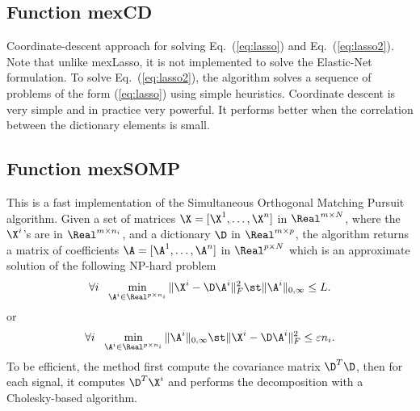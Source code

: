 \documentclass[a4paper, 11pt]{article}
\begin{document}
{\footnotesize

}


\subsection{Function mexCD}
Coordinate-descent approach for solving Eq.~(\ref{eq:lasso}) and
Eq.~(\ref{eq:lasso2}). Note that unlike mexLasso, it is not implemented to solve the Elastic-Net formulation.
To solve Eq.~(\ref{eq:lasso2}), the algorithm solves a
sequence of problems of the form (\ref{eq:lasso}) using simple heuristics.
Coordinate descent is very simple and in practice very powerful. It performs
better when the correlation between the dictionary elements is small. 

{\footnotesize

}

\subsection{Function mexSOMP}
This is a fast implementation of the Simultaneous Orthogonal Matching Pursuit algorithm. Given a set of matrices $\X=[\X^1,\ldots,\X^n]$  in $\Real^{m \times N}$, where the $\X^i$'s are in $\Real^{m \times n_i}$, and a dictionary $\D$ in $\Real^{m \times p}$, the algorithm returns a matrix of coefficients $\A=[\A^1,\ldots,\A^n]$ in $\Real^{p \times N}$ which is an approximate solution of the following NP-hard problem
\begin{equation}
   \forall i~~ \min_{\A^i \in \Real^{p \times n_i}} \|\X^i-\D\A^i\|_F^2 \st \|\A^i\|_{0,\infty} \leq L.
\end{equation}
or 
\begin{equation}
   \forall i~~ \min_{\A^i \in \Real^{p \times n_i}}  \|\A^i\|_{0,\infty} \st \|\X^i-\D\A^i\|_F^2 \leq \varepsilon n_i.
\end{equation}
To be efficient, the method first compute the covariance matrix $\D^T\D$, then for each signal, it computes $\D^T\X^i$ and performs the decomposition with a Cholesky-based algorithm.

{\footnotesize

}
\end{document}
